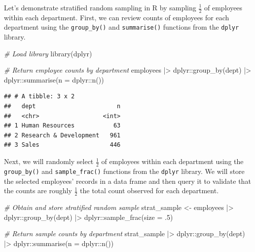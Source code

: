 \documentclass[
]{book}
\newenvironment{Shaded}{\begin{snugshade}}{\end{snugshade}}
\newcommand{\AttributeTok}[1]{\textcolor[rgb]{0.77,0.63,0.00}{#1}}
\newcommand{\CommentTok}[1]{\textcolor[rgb]{0.56,0.35,0.01}{\textit{#1}}}
\newcommand{\DecValTok}[1]{\textcolor[rgb]{0.00,0.00,0.81}{#1}}
\newcommand{\FunctionTok}[1]{\textcolor[rgb]{0.00,0.00,0.00}{#1}}
\newcommand{\NormalTok}[1]{#1}
\newcommand{\OtherTok}[1]{\textcolor[rgb]{0.56,0.35,0.01}{#1}}
\newcommand{\SpecialCharTok}[1]{\textcolor[rgb]{0.00,0.00,0.00}{#1}}
\begin{document}
Let's demonstrate stratified random sampling in R by sampling \(\frac{1}{2}\) of employees within each department. First, we can review counts of employees for each department using the \texttt{group\_by()} and \texttt{summarise()} functions from the \texttt{dplyr} library.

\begin{Shaded}
\begin{Highlighting}[]
\CommentTok{\# Load library}
\FunctionTok{library}\NormalTok{(dplyr)}

\CommentTok{\# Return employee counts by department}
\NormalTok{employees }\SpecialCharTok{|\textgreater{}}
\NormalTok{dplyr}\SpecialCharTok{::}\FunctionTok{group\_by}\NormalTok{(dept) }\SpecialCharTok{|\textgreater{}}
\NormalTok{dplyr}\SpecialCharTok{::}\FunctionTok{summarise}\NormalTok{(}\AttributeTok{n =}\NormalTok{ dplyr}\SpecialCharTok{::}\FunctionTok{n}\NormalTok{())}
\end{Highlighting}
\end{Shaded}

\begin{verbatim}
## # A tibble: 3 x 2
##   dept                       n
##   <chr>                  <int>
## 1 Human Resources           63
## 2 Research & Development   961
## 3 Sales                    446
\end{verbatim}

Next, we will randomly select \(\frac{1}{2}\) of employees within each department using the \texttt{group\_by()} and \texttt{sample\_frac()} functions from the \texttt{dplyr} library. We will store the selected employees' records in a data frame and then query it to validate that the counts are roughly \(\frac{1}{2}\) the total count observed for each department.

\begin{Shaded}
\begin{Highlighting}[]
\CommentTok{\# Obtain and store stratified random sample}
\NormalTok{strat\_sample }\OtherTok{\textless{}{-}}\NormalTok{ employees }\SpecialCharTok{|\textgreater{}}
\NormalTok{                dplyr}\SpecialCharTok{::}\FunctionTok{group\_by}\NormalTok{(dept) }\SpecialCharTok{|\textgreater{}}
\NormalTok{                dplyr}\SpecialCharTok{::}\FunctionTok{sample\_frac}\NormalTok{(}\AttributeTok{size =}\NormalTok{ .}\DecValTok{5}\NormalTok{)}

\CommentTok{\# Return sample counts by department}
\NormalTok{strat\_sample }\SpecialCharTok{|\textgreater{}}
\NormalTok{dplyr}\SpecialCharTok{::}\FunctionTok{group\_by}\NormalTok{(dept) }\SpecialCharTok{|\textgreater{}}
\NormalTok{dplyr}\SpecialCharTok{::}\FunctionTok{summarise}\NormalTok{(}\AttributeTok{n =}\NormalTok{ dplyr}\SpecialCharTok{::}\FunctionTok{n}\NormalTok{())}
\end{Highlighting}
\end{Shaded}
\end{document}
